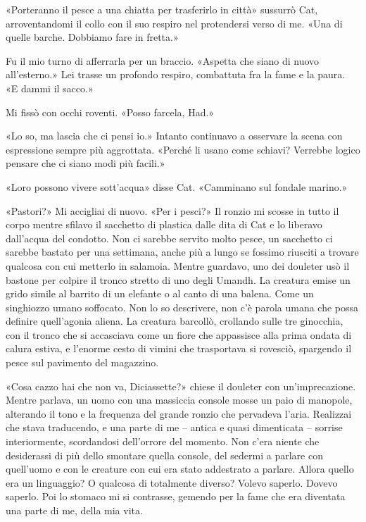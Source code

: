«Porteranno il pesce a una chiatta per trasferirlo in città» sussurrò
Cat, arroventandomi il collo con il suo respiro nel protendersi verso di
me. «Una di quelle barche. Dobbiamo fare in fretta.»

Fu il mio turno di afferrarla per un braccio. «Aspetta che siano di
nuovo all'esterno.» Lei trasse un profondo respiro, combattuta fra la
fame e la paura. «E dammi il sacco.»

Mi fissò con occhi roventi. «Posso farcela, Had.»

«Lo so, ma lascia che ci pensi io.» Intanto continuavo a osservare la
scena con espressione sempre più aggrottata. «Perché li usano come
schiavi? Verrebbe logico pensare che ci siano modi più facili.»

«Loro possono vivere sott'acqua» disse Cat. «Camminano sul fondale
marino.»

«Pastori?» Mi accigliai di nuovo. «Per i pesci?» Il ronzio mi scosse in
tutto il corpo mentre sfilavo il sacchetto di plastica dalle dita di Cat
e lo liberavo dall'acqua del condotto. Non ci sarebbe servito molto
pesce, un sacchetto ci sarebbe bastato per una settimana, anche più a
lungo se fossimo riusciti a trovare qualcosa con cui metterlo in
salamoia. Mentre guardavo, uno dei douleter usò il bastone per colpire
il tronco stretto di uno degli Umandh. La creatura emise un grido simile
al barrito di un elefante o al canto di una balena. Come un singhiozzo
umano soffocato. Non lo so descrivere, non c'è parola umana che possa
definire quell'agonia aliena. La creatura barcollò, crollando sulle tre
ginocchia, con il tronco che si accasciava come un fiore che appassisce
alla prima ondata di calura estiva, e l'enorme cesto di vimini che
trasportava si rovesciò, spargendo il pesce sul pavimento del magazzino.

«Cosa cazzo hai che non va, Diciassette?» chiese il douleter con
un'imprecazione. Mentre parlava, un uomo con una massiccia console mosse
un paio di manopole, alterando il tono e la frequenza del grande ronzio
che pervadeva l'aria. Realizzai che stava traducendo, e una parte di me
-- antica e quasi dimenticata -- sorrise interiormente, scordandosi
dell'orrore del momento. Non c'era niente che desiderassi di più dello
smontare quella console, del sedermi a parlare con quell'uomo e con le
creature con cui era stato addestrato a parlare. Allora quello era un
linguaggio? O qualcosa di totalmente diverso? Volevo saperlo. Dovevo
saperlo. Poi lo stomaco mi si contrasse, gemendo per la fame che era
diventata una parte di me, della mia vita.

